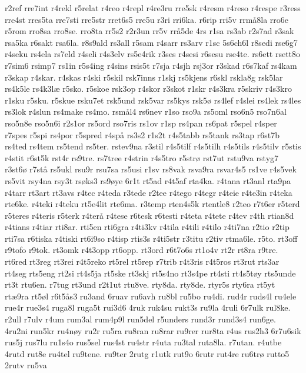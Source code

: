 {r2ref
rre7int
r4rekl
r5relat
r4reo
r4repl
r4re3ru
rre5sk
r4resm
r4reso
r4respe
r3ress
rre4st
rres5ta
rre7sti
rre5str
rret6s5
rre5u
r3ri
rri6ka.
r6rip
rri5v
rrm^^e58la
rro6e
r5rom
rro8sa
rro8se.
rro8ta
rr5s2
r2r3un
rr5v
rr^^e55de
4rs
r1sa
rs3ab
r2s7ad
r3sak
rsa5ka
r6sakt
rsa6la.
r8s9ald
rs3all
r5sam
r4sarr
rs3arv
r1sc
5s6ch6l
r8sedi
rse6g7
r4seku
rs4ela
rs7eld
r4seli
r4s3elv
rs5e4rik
r3ses
r4sesi
r6sesu
rse4te.
rs6ett
rsett8o
r7sim6
rsimp7
rs1in
r5s4ing
r4sins
rsis5t
r7sja
r4sjh
rsj3or
r3skad
r6s7kaf
rs4kam
r3skap
r4skar.
r4skas
r4ski
r5skil
rsk7inns
r1skj
rs5kjens
r6skl
rskla8g
rsk5lar
rs4k5le
rs4k3l^^e6
r5sko.
r5skoe
rsk3op
r4skor
r3skot
r1skr
r4s3kra
r5skriv
r4s3kro
r1sku
r5sku.
r5skue
rsku7et
rsk5und
rsk5var
rs5kys
rsk5^^f8
rs4lef
r4slei
rs4lek
rs4les
rs3lok
r4slun
rs4make
rs4mo.
rsm^^e5l4
rs6nev
r1so
rso9a
rs5oml
rso6n5
rso7n6al
rso5n8e
rso5n6i
r2s1or
rs5ord
rso7ris
rs1ov
r1sp
rs4pan
rs6pat
r5spel
r4sper
r7spes
r5spi
rs4por
r5spred
r4sp^^e5
rs3s2
r1s2t
r4s5tabb
rs5tank
rs3tap
r6st7b
rs4ted
rs4tem
rs5tend
rs5ter.
rstev9na
r3stil
r4s5tilf
r4s5tilh
r4s5tils
r4s5tilv
r5stis
r4stit
r6st5k
rst4r
rs9tre.
rs7tree
r4strin
r4s5tro
r5str^^f8
rst7ut
rstu9va
rstyg7
r3st6^^f8
r7st^^e5
rs5ukl
rsu9r
rsu7sa
rs5usi
r1sv
rs8vak
rsva9ra
rsvar4s5
rs1ve
r4s5vek
rs5vit
rsy4na
rsy3t
rs^^f8ks3
rs9^^f8ye
6r1t
rt5ad
r4t5af
rta4ka.
r4tana
rt3anl
rta9pa
r4tarr
rt3art
rt3avs
r4tec
r4teda
r3tede
r2tee
r4tego
r4tegr
r4teie
r4te3in
r4teka
rte6ke.
r4teki
r4teku
rt5e4lit
rte6ma.
r3temp
rten4s5k
rtentle8
r2teo
r7t6er
r5terd
r5teres
r4teris
r5terk
r4ter^^e5
r4tese
r6tesk
r6testi
r4teta
r4tete
r4tev
r4th
rtian8d
r4tians
r4tiar
rti8ar.
rti5en
rti6gra
r4ti3kv
r4tila
r4tili
r4tilo
r4ti7na
r2tio
r2tip
rti7sa
r6tiska
r4tiski
rt6i9so
r4tisp
rtis3s
r4ti5str
r3titu
r2tiv
rtma6le.
r5to.
rt3off
r9tofo
r9tok.
rt3omk
r4t3opp
rt6opp.
rt3ord
r6t7o6s
rt1o4v
rt2r
rt8ra
r9tre.
rt6red
rt3reg
rt3rei
r4t5reko
rt5rel
rt5rep
r7trib
r4t3ris
r4t5ros
rt3rut
rts3ar
rt4seg
rts5eng
rt2si
rt4s5ja
rt5ske
rt3skj
rt5s4no
rt3s4pe
rt4sti
rt4s5t^^f8y
rts5unde
rt3t
rtu6en.
r7tug
rt3und
r2t1ut
rtu8ve.
rty8da.
rty8de.
rtyr5s
rty6ra
rt5yt
rt^^e69ra
rt5^^f8l
r6t5^^e5s3
ru3and
6ruav
ru6avh
ru8bl
ru5bo
ru4di.
rud4r
ruds4l
ru4ele
rue4r
rue3s4
ruga8l
ruga5t
rui3d6
4ruk
ruk4su
rukt3s
ru9la
4ruli
6r7ulk
rul8ke.
r2ull
r7ulv
r4um
rum3al
rum4p9l
run5del
r5unders
rund3r
rund3s4
run6ge.
4ru2ni
run5kr
ru4n^^f8y
ru2r
ru5ra
ru8ran
ru8rar
ru9rer
rur8ta
r4us
rus2h3
6r7u6sik
rus5j
rus7lu
ru1s4o
rus5sel
rus4st
ru4str
r4uta
ru3tal
ruta8la.
r7utan.
r4utbe
4rutd
rut8e
ru4tel
ru9tene.
ru9ter
2rutg
r1utk
rut9o
6rutr
rut4re
ru6tr^^f8
rutto5
2rutv
ru5va
}
